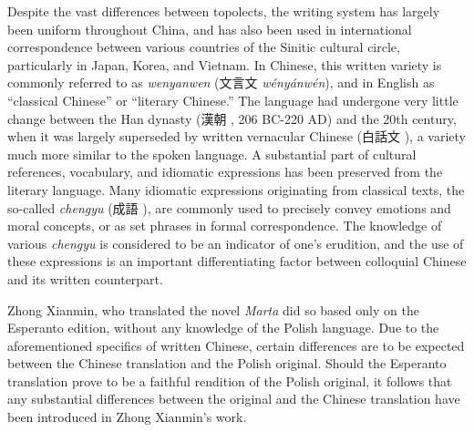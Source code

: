 Despite the vast differences between topolects, the writing system has largely been uniform throughout China, and has also been used in international correspondence between various countries of the Sinitic cultural circle, particularly in Japan, Korea, and Vietnam.
In Chinese, this written variety is commonly referred to as \textit{wenyanwen} (文言文 \textit{wényánwén}), and in English as ``classical Chinese'' or ``literary Chinese.''
The language had undergone very little change between the Han dynasty (漢朝 , 206 BC-220 AD) and the 20th century, when it was largely superseded by written vernacular Chinese (白話文 ), a variety much more similar to the spoken language.
A substantial part of cultural references, vocabulary, and idiomatic expressions has been preserved from the literary language.
Many idiomatic expressions originating from classical texts, the so-called \textit{chengyu} (成語 ), are commonly used to precisely convey emotions and moral concepts, or as set phrases in formal correspondence.
The knowledge of various \textit{chengyu} is considered to be an indicator of one's erudition, and the use of these expressions is an important differentiating factor between colloquial Chinese and its written counterpart.

Zhong Xianmin, who translated the novel \textit{Marta} did so based only on the Esperanto edition, without any knowledge of the Polish language.
Due to the aforementioned specifics of written Chinese, certain differences are to be expected between the Chinese translation and the Polish original.
Should the Esperanto translation prove to be a faithful rendition of the Polish original, it follows that any substantial differences between the original and the Chinese translation have been introduced in Zhong Xianmin's work.

